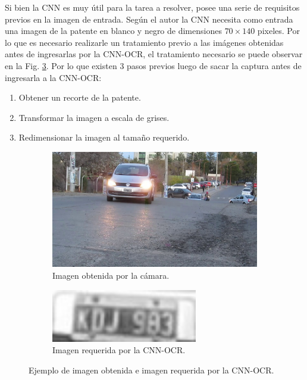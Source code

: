 Si bien la CNN es muy útil para la tarea a resolver, posee una serie de requisitos previos en la imagen de entrada. Según el autor la CNN
necesita como entrada una imagen de la patente en blanco y negro de dimensiones $70 \times 140$ pixeles.
Por lo que es necesario realizarle un tratamiento previo a las imágenes obtenidas antes de ingresarlas por la CNN-OCR, el tratamiento necesario
se puede observar en la Fig. \ref{fig:Comparativa-imagenes}. Por lo que existen 3 pasos previos luego de sacar
la captura antes de ingresarla a la CNN-OCR:

\begin{enumerate}
    \item Obtener un recorte de la patente.
    \item Transformar la imagen a escala de grises.
    \item Redimensionar la imagen al tamaño requerido.
\end{enumerate}
\begin{figure}[!tbp]
    \centering
    \begin{subfigure}[b]{0.49\textwidth}
        \centering
        \includegraphics[width=\textwidth]{imgs/imagen-obtenida.jpg}
        \caption{Imagen obtenida por la cámara.}
        \label{fig:imagen-obtenida}
    \end{subfigure}
    \hfill
    \begin{subfigure}[b]{0.49\textwidth}
        \centering
        \includegraphics[width=0.7\textwidth]{imgs/imagen-requerida.jpg}
        \caption{Imagen requerida por la CNN-OCR.}
        \label{fig:imagen-requerida}
    \end{subfigure}
    \caption{Ejemplo de imagen obtenida e imagen requerida por la CNN-OCR.}
    \label{fig:Comparativa-imagenes}
\end{figure}

